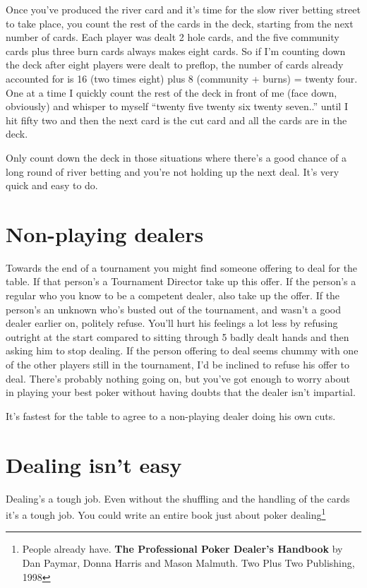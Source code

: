 Once you've produced the river card and it's time for the slow
river betting street to take place, you count the rest of the
cards in the deck, starting from the next number of cards.
Each player was dealt 2 hole cards, and the five community
cards plus three burn cards always makes eight cards. So if
I'm counting down the deck after eight players were dealt
to preflop, the number of cards already accounted for is
16 (two times eight) plus 8 (community + burns) = twenty four.
One at a time I quickly count the rest of the deck in front
of me (face down, obviously) and whisper to myself
``twenty five twenty six twenty seven..'' until I hit fifty two
and then the next card is the cut card and all the cards
are in the deck.

Only count down the deck in those situations where there's
a good chance of a long round of river betting and you're
not holding up the next deal. It's very quick and easy to
do.

\section{Non-playing dealers}

Towards the end of a tournament you might find someone offering
to deal for the table. If that person's a Tournament Director
take up this offer. If the person's a
regular who you know to be a competent dealer, also take up
the offer. If the person's an unknown who's busted out of the
tournament, and wasn't a good dealer earlier on, politely
refuse. You'll hurt his feelings a lot less by refusing outright
at the start compared to sitting through 5 badly dealt hands
and then asking him to stop dealing. If the person
offering to deal seems chummy with one of the other players
still in the tournament, I'd be inclined to refuse his offer
to deal. There's probably nothing going on, but you've got
enough to worry about in playing your best poker without
having doubts that the dealer isn't impartial.

It's fastest for the table to agree to a non-playing dealer
doing his own cuts.

\section{Dealing isn't easy}

Dealing's a tough job. Even without the shuffling and the handling
of the cards it's a tough job. You could write an entire book
just about poker dealing\footnote{People already have. \textbf{The
Professional Poker Dealer's Handbook} by Dan Paymar, Donna Harris
and Mason Malmuth. Two Plus Two Publishing, 1998}

